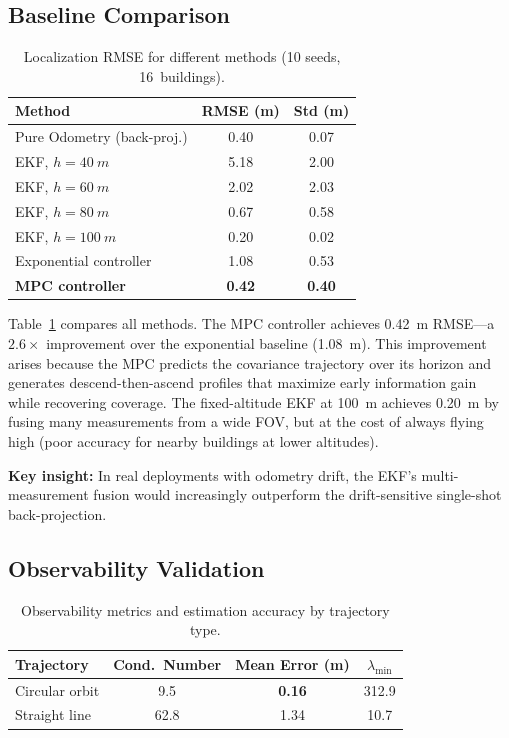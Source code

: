 \documentclass[journal]{IEEEtran}
\begin{document}
\subsection{Baseline Comparison}

\begin{table}[t]
\centering
\caption{Localization RMSE for different methods (10 seeds, 16~buildings).}
\label{tab:baseline}
\begin{tabular}{@{}lcc@{}}
\toprule
\textbf{Method} & \textbf{RMSE (m)} & \textbf{Std (m)} \\
\midrule
Pure Odometry (back-proj.) & 0.40 & 0.07 \\
\midrule
EKF, $h = \SI{40}{m}$ & 5.18 & 2.00 \\
EKF, $h = \SI{60}{m}$ & 2.02 & 2.03 \\
EKF, $h = \SI{80}{m}$ & 0.67 & 0.58 \\
EKF, $h = \SI{100}{m}$ & 0.20 & 0.02 \\
\midrule
Exponential controller & 1.08 & 0.53 \\
\textbf{MPC controller} & \textbf{0.42} & \textbf{0.40} \\
\bottomrule
\end{tabular}
\end{table}

Table~\ref{tab:baseline} compares all methods.
The MPC controller achieves \SI{0.42}{m} RMSE---a $2.6\times$ improvement over the exponential baseline (\SI{1.08}{m}).
This improvement arises because the MPC predicts the covariance trajectory over its horizon and generates descend-then-ascend profiles that maximize early information gain while recovering coverage.
The fixed-altitude EKF at \SI{100}{m} achieves \SI{0.20}{m} by fusing many measurements from a wide FOV, but at the cost of always flying high (poor accuracy for nearby buildings at lower altitudes).

\textbf{Key insight:} In real deployments with odometry drift, the EKF's multi-measurement fusion would increasingly outperform the drift-sensitive single-shot back-projection.

\subsection{Observability Validation}\label{sec:obs_exp}

\begin{table}[t]
\centering
\caption{Observability metrics and estimation accuracy by trajectory type.}
\label{tab:observability}
\begin{tabular}{@{}lccc@{}}
\toprule
\textbf{Trajectory} & \textbf{Cond.\ Number} & \textbf{Mean Error (m)} & \textbf{$\lambda_{\min}$} \\
\midrule
Circular orbit & 9.5 & \textbf{0.16} & 312.9 \\
Straight line  & 62.8 & 1.34 & 10.7 \\
\bottomrule
\end{tabular}
\end{table}
\end{document}
